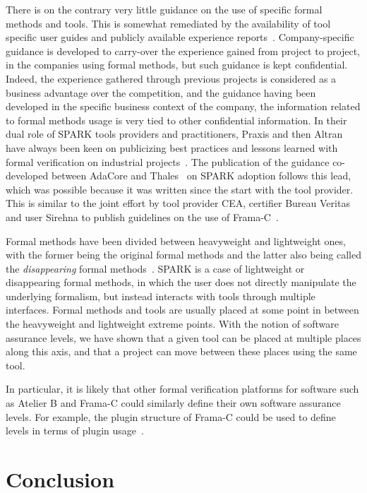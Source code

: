 \documentclass{llncs}
\begin{document}
There is on the contrary very little guidance on the use of specific formal
methods and tools. This is somewhat remediated by the availability of tool
specific user guides and publicly available experience
reports~\cite{Woodcock2009}. Company-specific guidance is developed to
carry-over the experience gained from project to project, in the companies
using formal methods, but such guidance is kept confidential. Indeed, the
experience gathered through previous projects is considered as a business
advantage over the competition, and the guidance having been developed in the
specific business context of the company, the information related to formal
methods usage is very tied to other confidential information. In their dual
role of SPARK tools providers and practitioners, Praxis and then Altran have
always been keen on publicizing best practices and lessons learned with formal
verification on industrial
projects~\cite{KingHCP00,Chapman2006CCM,Chapman2014ITP}. The publication of the
guidance co-developed between AdaCore and Thales~\cite{AdaCoreThalesSPARK} on
SPARK adoption follows this lead, which was possible because it was written
since the start with the tool provider. This is similar to the joint effort by
tool provider CEA, certifier Bureau Veritas and user Sirehna to publish
guidelines on the use of Frama-C~\cite{FramaCguidelines}.

Formal methods have been divided between heavyweight and lightweight ones, with
the former being the original formal methods and the latter also being called
the \textit{disappearing} formal methods~\cite{hase00}. SPARK is a case of
lightweight or disappearing formal methods, in which the user does not directly
manipulate the underlying formalism, but instead interacts with tools through
multiple interfaces. Formal methods and tools are usually placed at some point
in between the heavyweight and lightweight extreme points. With the notion of
software assurance levels, we have shown that a given tool can be placed at
multiple places along this axis, and that a project can move between these
places using the same tool.

In particular, it is likely that other formal verification platforms for
software such as Atelier B and Frama-C could similarly define their own
software assurance levels. For example, the plugin structure of Frama-C could
be used to define levels in terms of plugin usage~\cite{Kirchner2015}.

\section{Conclusion}
\label{sec:conclusion}
\end{document}
